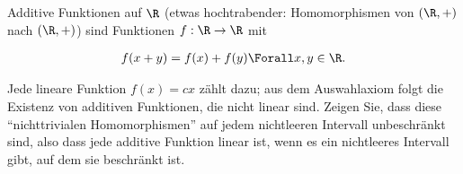 
\begin{exercise}

Additive Funktionen auf $\R$ (etwas hochtrabender: Homomorphismen von $(\R, +)$ nach $(\R, +)$) sind Funktionen $f: \R \to \R$ mit

\begin{align*}
    f(x + y) = f(x) + f(y)
    \Forall x, y \in \R.
\end{align*}

Jede lineare Funktion $f(x) = c x$ zählt dazu;
aus dem Auswahlaxiom folgt die Existenz von additiven Funktionen, die nicht linear sind.
Zeigen Sie, dass diese \enquote{nichttrivialen Homomorphismen} auf jedem nichtleeren Intervall unbeschränkt sind, also dass jede additive Funktion linear ist, wenn es ein nichtleeres Intervall gibt, auf dem sie beschränkt ist.

\end{exercise}



